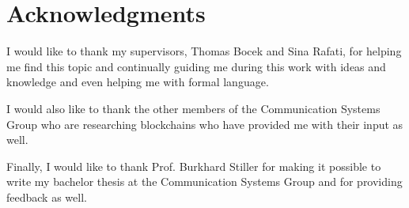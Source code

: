\chapter*{Acknowledgments}

I would like to thank my supervisors, Thomas Bocek and Sina Rafati, for helping me find this topic and continually guiding me during this work with ideas and knowledge and even helping me with formal language.

I would also like to thank the other members of the Communication Systems Group who are researching blockchains who have provided me with their input as well.

Finally, I would like to thank Prof. Burkhard Stiller for making it possible to write my bachelor thesis at the Communication Systems Group and for providing feedback as well.
